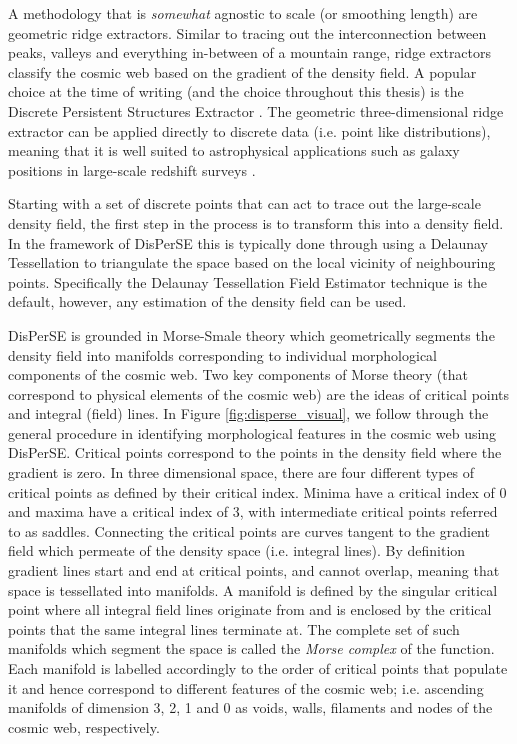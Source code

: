 A methodology that is \textit{somewhat} agnostic to scale (or smoothing length) are geometric ridge extractors. Similar to tracing out the interconnection between peaks, valleys and everything in-between of a mountain range, ridge extractors classify the cosmic web based on the gradient of the density field. A popular choice at the time of writing (and the choice throughout this thesis) is the Discrete Persistent Structures Extractor \citep[DisPerSE][]{sousbie2011a, sousbie2011b}. The geometric three-dimensional ridge extractor can be applied directly to discrete data (i.e. point like distributions), meaning that it is well suited to astrophysical applications such as galaxy positions in large-scale redshift surveys \citep[e.g.][]{malavasi2017, kraljic2018}.

Starting with a set of discrete points that can act to trace out the large-scale density field, the first step in the process is to transform this into a density field. In the framework of DisPerSE this is typically done through using a Delaunay Tessellation to triangulate the space based on the local vicinity of neighbouring points. Specifically the Delaunay Tessellation Field Estimator technique \citep[DTFE;][]{schaap2000, cautun2011} is the default, however, any estimation of the density field can be used. 

DisPerSE is grounded in Morse-Smale theory which geometrically segments the density field into manifolds corresponding to individual morphological components of the cosmic web. Two key components of Morse theory (that correspond to physical elements of the cosmic web) are the ideas of critical points and integral (field) lines. In Figure \ref{fig:disperse_visual}, we follow through the general procedure in identifying morphological features in the cosmic web using DisPerSE. Critical points correspond to the points in the density field where the gradient is zero. In three dimensional space, there are four different types of critical points as defined by their critical index. Minima have a critical index of 0 and maxima have a critical index of 3, with intermediate critical points referred to as saddles. Connecting the critical points are curves tangent to the gradient field which permeate of the density space (i.e. integral lines). By definition gradient lines start and end at critical points, and cannot overlap, meaning that space is tessellated into manifolds. A manifold is defined by the singular critical point where all integral field lines originate from and is enclosed by the critical points that the same integral lines terminate at. The complete set of such manifolds which segment the space is called the \textit{Morse complex} of the function. Each manifold is labelled accordingly to the order of critical points that populate it and hence correspond to different features of the cosmic web; i.e. ascending manifolds of dimension 3, 2, 1 and 0 as voids, walls, filaments and nodes of the cosmic web, respectively. 

